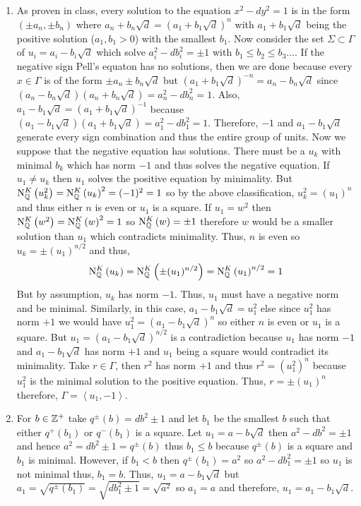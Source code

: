\documentclass[12pt]{extarticle}
\begin{document}
\begin{enumerate}
\begin{enumerate}
\item As proven in class, every solution to the equation $x^2 - d y^2 = 1$ is in the form $(\pm a_n, \pm b_n)$ where $a_n + b_n \sqrt{d} = (a_1 + b_1 \sqrt{d})^n$ with $a_1 + b_1 \sqrt{d}$ being the positive solution ($a_1, b_1 > 0$) with the smallest $b_1$. Now consider the set $\Sigma \subset \Gamma$ of $u_i = a_i - b_i \sqrt{d}$ which solve $a_i^2 - d b_i^2 = \pm 1$ with $b_1 \le b_2 \le b_3 \dots$. If the negative sign Pell's equaton has no solutions, then we are done because every $x \in \Gamma$ is of the form $\pm a_n \pm b_n \sqrt{d}$ but $(a_1 + b_1 \sqrt{d})^{-n} = a_n - b_n \sqrt{d}$ since $(a_n - b_n \sqrt{d})(a_n + b_n \sqrt{d}) = a_n^2 - d b_n^2 = 1$. Also, $a_1 - b_1 \sqrt{d} = (a_1 + b_1 \sqrt{d})^{-1}$ because $(a_1 - b_1 \sqrt{d})(a_1 + b_1 \sqrt{d}) = a_1^2 - d b_1^2 = 1$. Therefore, $-1$ and $a_1 - b_1 \sqrt{d}$ generate every sign combination and thus the entire group of units. Now we suppose that the negative equation has solutions. There must be a $u_k$ with minimal $b_k$ which has norm $-1$ and thus solves the negative equation. If $u_1 \neq u_k$ then $u_1$ solves the positive equation by minimality. But $\mathrm{N}^{K}_{\mathbb{Q}}\left(u_k^2\right) = \mathrm{N}^{K}_{\mathbb{Q}}\left(u_k\right)^2 = (-1)^2 = 1$ so by the above classification, $u_k^2 = (u_1)^n$ and thus either $n$ is even or $u_1$ is a square. If $u_1 = w^2$ then $\mathrm{N}^{K}_{\mathbb{Q}}\left(w^2\right) = \mathrm{N}^{K}_{\mathbb{Q}}\left(w\right)^2 = 1$ so $\mathrm{N}^{K}_{\mathbb{Q}}\left(w\right) = \pm 1$ therefore $w$ would be a smaller solution than $u_1$ which contradicts minimality. Thus, $n$ is even so $u_k = \pm (u_1)^{n/2}$ and thus, \[\mathrm{N}^{K}_{\mathbb{Q}}\left(u_k\right) = \mathrm{N}^{K}_{\mathbb{Q}}\left(\pm (u_1)^{n/2}\right) = \mathrm{N}^{K}_{\mathbb{Q}}\left(u_1\right)^{n/2} = 1\] But by assumption, $u_k$ has norm $-1$. Thus, $u_1$ must have a negative norm and be minimal. Similarly, in this case, $a_1 - b_1 \sqrt{d} = u_1^2$ else since $u_1^2$ has norm $+1$ we would have $u_1^2 = (a_1 - b_1 \sqrt{d})^n$ so either $n$ is even or $u_1$ is a square. But $u_1 = (a_1 - b_1 \sqrt{d})^{n/2}$ is a contradiction because $u_1$ has norm $-1$ and $a_1 - b_1 \sqrt{d}$ has norm $+1$ and $u_1$ being a square would contradict its minimality. Take $r \in \Gamma$, then $r^2$ has norm $+1$ and thus $r^2 = (u_1^2)^n$ because $u_1^2$ is the minimal solution to the positive equation. Thus, $r = \pm (u_1)^n$ therefore, $\Gamma = \left< u_1, -1 \right>$.       

\item For $b \in \mathbb{Z}^{+}$ take $q^{\pm}(b) = db^2 \pm 1$ and let $b_1$ be the smallest $b$ such that either $q^+(b_1)$ or $q^-(b_1)$ is a square. Let $u_1 = a - b \sqrt{d}$ then $a^2 - d b^2 = \pm 1$ and hence $a^2 = db^2 \pm 1 = q^{\pm}(b)$ thus $b_1 \le b$ because $q^{\pm}(b)$ is a square and $b_1$ is minimal. However, if $b_1 < b$ then $q^{\pm}(b_1) = a^2$ so $a^2 - d b_1^2 = \pm 1$ so $u_1$ is not minimal thus, $b_1 = b$. Thus, $u_1 = a - b_1 \sqrt{d}$ but $a_1 = \sqrt{q^{\pm}(b_1)} = \sqrt{d b_1^2 \pm 1} = \sqrt{a^2}$ so $a_1 = a$ and therefore, $u_1 = a_1 - b_1 \sqrt{d}$. 


\end{enumerate}
\end{enumerate}
\end{document}
